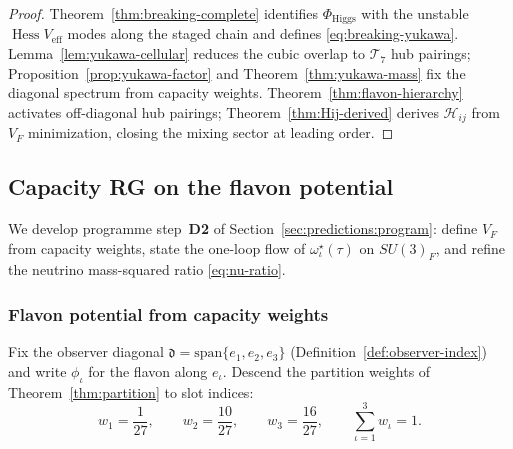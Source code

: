 \documentclass[11pt]{article}
\theoremstyle{plain}
\theoremstyle{definition}
\theoremstyle{remark}
\numberwithin{equation}{section}
\newcommand{\Hess}{\operatorname{Hess}}
\begin{document}
\begin{proof}
Theorem~\ref{thm:breaking-complete} identifies $\Phi_{\mathrm{Higgs}}$ with
the unstable $\Hess V_{\mathrm{eff}}$ modes along the staged chain and defines
\eqref{eq:breaking-yukawa}. Lemma~\ref{lem:yukawa-cellular} reduces the cubic
overlap to $\mathcal{T}_7$ hub pairings; Proposition~\ref{prop:yukawa-factor}
and Theorem~\ref{thm:yukawa-mass} fix the diagonal spectrum from capacity
weights. Theorem~\ref{thm:flavon-hierarchy} activates off-diagonal hub pairings;
Theorem~\ref{thm:Hij-derived} derives $\mathcal{H}_{ij}$ from $V_F$
minimization, closing the mixing sector at leading order.
\end{proof}%
\subsection{Capacity RG on the flavon potential}
\label{sec:physics:flavon-rg}

We develop programme step~\textbf{D2} of Section~\ref{sec:predictions:program}:
define $V_F$ from capacity weights, state the one-loop flow of
$\omega^\star_\iota(\tau)$ on $SU(3)_F$, and refine the neutrino mass-squared
ratio \eqref{eq:nu-ratio}.

\subsubsection{Flavon potential from capacity weights}

Fix the observer diagonal $\mathfrak{d}=\mathrm{span}\{e_1,e_2,e_3\}$
(Definition~\ref{def:observer-index}) and write $\phi_\iota$ for the flavon
along $e_\iota$. Descend the partition weights of Theorem~\ref{thm:partition} to
slot indices:
\begin{equation}\label{eq:flavon-weights}
  w_1=\frac{1}{27},\qquad w_2=\frac{10}{27},\qquad w_3=\frac{16}{27},
  \qquad \sum_{\iota=1}^3 w_\iota=1.
\end{equation}
\end{document}
